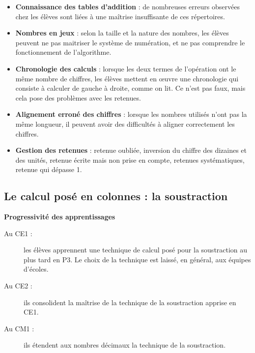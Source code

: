 \smallskip

{\renewcommand{\StringDOCUMENTATION}{Difficultés rencontrées par les élèves :}
\begin{documentation}
   \begin{itemize}
      \item {\bf Connaissance des tables d'addition} : de nombreuses erreurs observées chez les élèves sont liées à une maîtrise insuffisante de ces répertoires.
      \item {\bf Nombres en jeux} : selon la taille et la nature des nombres, les élèves peuvent ne pas maitriser le système de numération, et ne pas comprendre le fonctionnement de l'algorithme.
      \item {\bf Chronologie des calculs} : lorsque les deux termes de l'opération ont le même nombre de chiffres, les élèves mettent en \oe uvre une chronologie qui consiste à calculer de gauche à droite, comme on lit. Ce n'est pas faux, mais cela pose des problèmes avec les retenues.
      \item {\bf Alignement erroné des chiffres} : lorsque les nombres utilisés n'ont pas la même longueur, il peuvent avoir des difficultés à aligner correctement les chiffres.
      \item {\bf Gestion des retenues} : retenue oubliée, inversion du chiffre des dizaines et des unités, retenue écrite mais non prise en compte, retenues systématiques, retenue qui dépasse 1. \\ [-8mm]
   \end{itemize}
\end{documentation}}

\pagebreak


\subsection{Le calcul posé en colonnes : la soustraction}%

{\bf Progressivité des apprentissages}
\begin{description}
   \item[Au CE1 :] les élèves apprennent une technique de calcul posé pour la soustraction au plus tard en P3. Le choix de la technique est laissé, en général, aux équipes d’écoles.
   \item[Au CE2 :] ils consolident la maîtrise de la technique de la soustraction apprise en CE1.
   \item[Au CM1 :] ils étendent aux nombres décimaux la technique de la soustraction.
\end{description}

